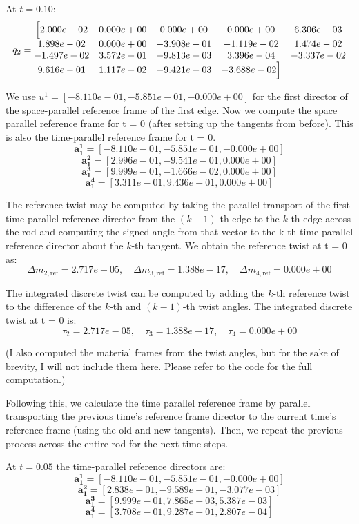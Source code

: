 \documentclass[letterpaper, 10 pt, conference]{ieeeconf}  %
\begin{document}
At \( t = 0.10 \):
\[ q_2 = \begin{matrix}
\Bigl[ 2.000e-02 & 0.000e+00 & 0.000e+00 & 0.000e+00 & 6.306e-03 \\
1.898e-02 & 0.000e+00 & -3.908e-01 & -1.119e-02 & 1.474e-02 \\
-1.497e-02 & 3.572e-01 & -9.813e-03 & 3.396e-04 & -3.337e-02 \\
9.616e-01 & 1.117e-02 & -9.421e-03 & -3.688e-02 \Bigr]
\end{matrix} \]


We use $u^1 = [-8.110e-01, -5.851e-01, -0.000e+00]$ for the first director of the space-parallel reference frame of the first edge. Now we compute the space parallel reference frame for t = 0 (after setting up the tangents from before). This is also the time-parallel reference frame for t = 0.
\[ 
\mathbf{a_1^1} = [-8.110e-01, -5.851e-01, -0.000e+00] \]
\[
\mathbf{a_1^2} = [ 2.996e-01, -9.541e-01,  0.000e+00] \]
\[
\mathbf{a_1^3} = [ 9.999e-01, -1.666e-02,  0.000e+00] \]
\[
\mathbf{a_1^4} = [ 3.311e-01,  9.436e-01,  0.000e+00] \]

The reference twist may be computed by taking the parallel transport of the first time-parallel reference director from the $(k - 1)$-th edge to the $k$-th edge across the rod and computing the signed angle from that vector to the k-th time-parallel reference director about the $k$-th tangent. We obtain the reference twist at t = 0 as:
\[
\Delta m_{2, \text{ref}} = 2.717e-05, \quad \Delta m_{3, \text{ref}} = 1.388e-17, \quad \Delta m_{4, \text{ref}} = 0.000e+00
\]

The integrated discrete twist can be computed by adding the $k$-th reference twist to the difference of the $k$-th and $(k - 1)$-th twist angles. The integrated discrete twist at t = 0 is:
\[
\tau_2 = 2.717e-05, \quad \tau_3 = 1.388e-17, \quad \tau_4 = 0.000e+00
\]

(I also computed the material frames from the twist angles, but for the sake of brevity, I will not include them here. Please refer to the code for the full computation.)

Following this, we calculate the time parallel reference frame by parallel transporting the previous time's reference frame director to the current time's reference frame (using the old and new tangents). Then, we repeat the previous process across the entire rod for the next time steps. 

At \( t = 0.05 \) the time-parallel reference directors are:
\[ 
\mathbf{a_1^1} = [-8.110e-01, -5.851e-01, -0.000e+00] \]
\[ 
\mathbf{a_1^2} = [ 2.838e-01, -9.589e-01, -3.077e-03] \]
\[ 
\mathbf{a_1^3} = [ 9.999e-01,  7.865e-03,  5.387e-03] \]
\[ 
\mathbf{a_1^4} = [ 3.708e-01,  9.287e-01,  2.807e-04] \]
\end{document}
